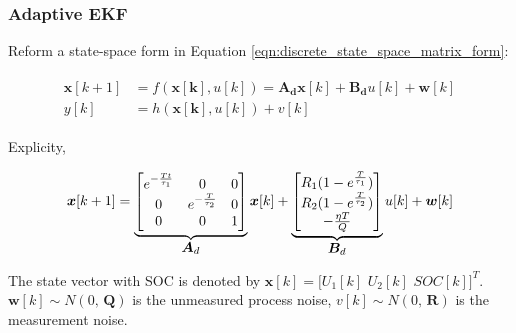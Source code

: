 \documentclass{beamer}
\begin{document}
\begin{frame}
	
	\frametitle{Adaptive EKF}
	
	Reform a state-space form in Equation \ref{eqn:discrete_state_space_matrix_form}: 
	
	\begin{align}
		\label{eqn:discrete_state_space_matrix_form_for_EKF_1}
		\begin{split}
			\bm{x}[k+1] &= f(\bm{x[k]},u[k]) =\bm{A_{d}}\bm{x}[k] + \bm{B_{d}}u[k] + \bm{w}[k]\\
			y[k] &= h(\bm{x[k]},u[k]) + v[k]
		\end{split}
	\end{align}
	
	Explicity,
	
	\begin{equation}
		\label{eqn:discrete_state_space_matrix_form_for_EKF_2}
		\bm{x}[k+1] = \underbrace{\begin{bmatrix}
				e^{-\frac{Tt}{\tau_{1}}} & 0 & 0\\
				0 & e^{-\frac{T}{\tau_{2}}} & 0 \\
				0 & 0 & 1
		\end{bmatrix}}_{\let\scriptstyle\textstyle\substack{\bm{A}_{d}}} \bm{x}[k] + \underbrace{\begin{bmatrix}
				R_{1}(1 - e^{\frac{T}{\tau_{1}}})  \\
				R_{2}(1 - e^{\frac{T}{\tau_{2}}})  \\
				-\frac{\eta T}{Q}
		\end{bmatrix}}_{\let\scriptstyle\textstyle\substack{\bm{B}_{d}}} u[k]
		+ \bm{w}[k]
	\end{equation}
	
	The state vector with SOC is denoted by $\bm{x}[k] = \bigg[U_{1}[k]\,\,U_{2}[k]\,\,SOC[k]\bigg]^{T}$. $\bm{w}[k] \sim {N}(0,\,\bm{Q})$ is the unmeasured process noise, $v[k] \sim {N}(0,\,\bm{R})$ is the measurement noise.
	
\end{frame}
\end{document}
